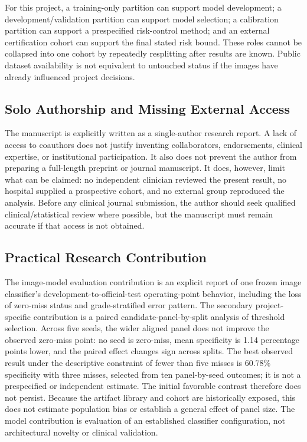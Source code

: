 \documentclass{ieeeaccess}
\begin{document}
For this project, a training-only partition can support model development; a development/validation partition can support model selection; a calibration partition can support a prespecified risk-control method; and an external certification cohort can support the final stated risk bound. These roles cannot be collapsed into one cohort by repeatedly resplitting after results are known. Public dataset availability is not equivalent to untouched status if the images have already influenced project decisions.

\subsection{Solo Authorship and Missing External Access}
The manuscript is explicitly written as a single-author research report. A lack of access to coauthors does not justify inventing collaborators, endorsements, clinical expertise, or institutional participation. It also does not prevent the author from preparing a full-length preprint or journal manuscript. It does, however, limit what can be claimed: no independent clinician reviewed the present result, no hospital supplied a prospective cohort, and no external group reproduced the analysis. Before any clinical journal submission, the author should seek qualified clinical/statistical review where possible, but the manuscript must remain accurate if that access is not obtained.

\subsection{Practical Research Contribution}
The image-model evaluation contribution is an explicit report of one frozen image classifier's development-to-official-test operating-point behavior, including the loss of zero-miss status and grade-stratified error pattern. The secondary project-specific contribution is a paired candidate-panel-by-split analysis of threshold selection. Across five seeds, the wider aligned panel does not improve the observed zero-miss point: no seed is zero-miss, mean specificity is 1.14 percentage points lower, and the paired effect changes sign across splits. The best observed result under the descriptive constraint of fewer than five misses is 60.78\% specificity with three misses, selected from ten panel-by-seed outcomes; it is not a prespecified or independent estimate. The initial favorable contrast therefore does not persist. Because the artifact library and cohort are historically exposed, this does not estimate population bias or establish a general effect of panel size. The model contribution is evaluation of an established classifier configuration, not architectural novelty or clinical validation.
\end{document}
